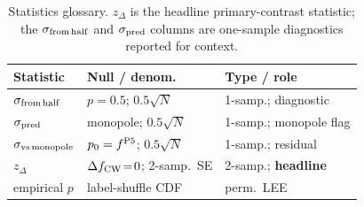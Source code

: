 \documentclass[aps,prd,twocolumn,superscriptaddress,showpacs,preprintnumbers,nofootinbib,longbibliography,floatfix]{revtex4-2}
\begin{document}
\begin{table}[ht]
\caption{Statistics glossary. $z_\Delta$ is the headline primary-contrast
statistic; the $\sigma_{\rm from\,half}$ and $\sigma_{\rm pred}$ columns
are one-sample diagnostics reported for context.}
\label{tab:stats_glossary}
{\small
\begin{ruledtabular}
\begin{tabular}{lll}
Statistic & Null / denom.\ & Type / role \\
\hline
$\sigma_{\rm from\,half}$ & $p=0.5$; $0.5\sqrt{N}$ & 1-samp.; diagnostic \\
$\sigma_{\rm pred}$ & monopole; $0.5\sqrt{N}$ & 1-samp.; monopole flag \\
$\sigma_{\rm vs\,monopole}$ & $p_0=f^{\rm P5}$; $0.5\sqrt{N}$ & 1-samp.; residual \\
$z_\Delta$ & $\Delta f_{\rm CW}\!=\!0$; 2-samp.\ SE & 2-samp.; \textbf{headline} \\
empirical $p$ & label-shuffle CDF & perm.\ LEE \\
\end{tabular}
\end{ruledtabular}
}
\end{table}
\end{document}
